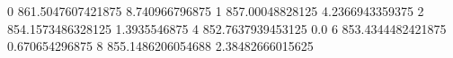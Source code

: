 0 861.5047607421875 8.740966796875
1 857.00048828125 4.2366943359375
2 854.1573486328125 1.3935546875
4 852.7637939453125 0.0
6 853.4344482421875 0.670654296875
8 855.1486206054688 2.38482666015625
